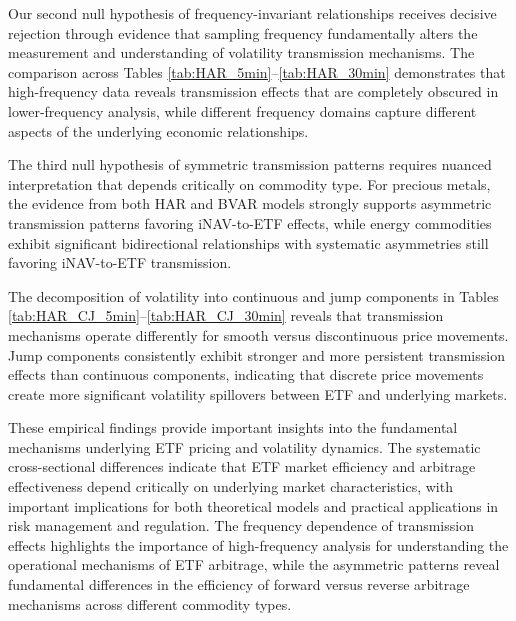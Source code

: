 Our second null hypothesis of frequency-invariant relationships receives decisive rejection through evidence that sampling frequency fundamentally alters the measurement and understanding of volatility transmission mechanisms. The comparison across Tables \ref{tab:HAR_5min}--\ref{tab:HAR_30min} demonstrates that high-frequency data reveals transmission effects that are completely obscured in lower-frequency analysis, while different frequency domains capture different aspects of the underlying economic relationships.

The third null hypothesis of symmetric transmission patterns requires nuanced interpretation that depends critically on commodity type. For precious metals, the evidence from both HAR and BVAR models strongly supports asymmetric transmission patterns favoring iNAV-to-ETF effects, while energy commodities exhibit significant bidirectional relationships with systematic asymmetries still favoring iNAV-to-ETF transmission.

The decomposition of volatility into continuous and jump components in Tables \ref{tab:HAR_CJ_5min}--\ref{tab:HAR_CJ_30min} reveals that transmission mechanisms operate differently for smooth versus discontinuous price movements. Jump components consistently exhibit stronger and more persistent transmission effects than continuous components, indicating that discrete price movements create more significant volatility spillovers between ETF and underlying markets.

These empirical findings provide important insights into the fundamental mechanisms underlying ETF pricing and volatility dynamics. The systematic cross-sectional differences indicate that ETF market efficiency and arbitrage effectiveness depend critically on underlying market characteristics, with important implications for both theoretical models and practical applications in risk management and regulation. The frequency dependence of transmission effects highlights the importance of high-frequency analysis for understanding the operational mechanisms of ETF arbitrage, while the asymmetric patterns reveal fundamental differences in the efficiency of forward versus reverse arbitrage mechanisms across different commodity types.